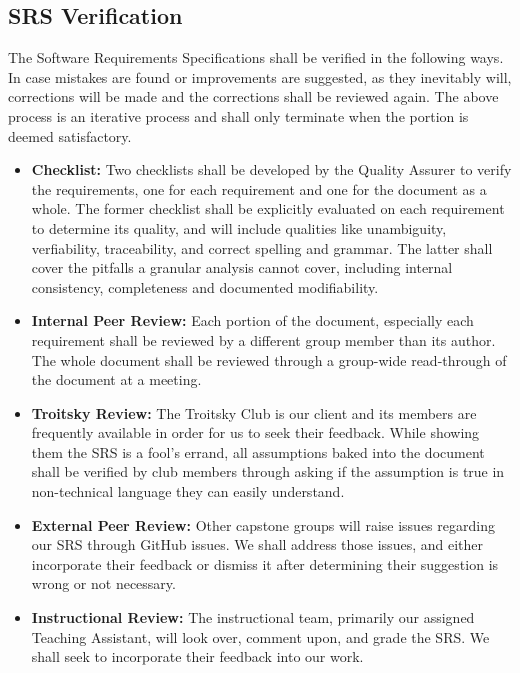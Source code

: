 \documentclass[12pt, titlepage]{article}
\begin{document}
\subsection{SRS Verification}





The Software Requirements Specifications shall be verified in the following ways. In case mistakes are found or improvements are suggested, as they inevitably will, corrections will be made and the corrections shall be reviewed again.
The above process is an iterative process and shall only terminate when the portion is deemed satisfactory.

\begin{itemize}
    \item \textbf{Checklist:} Two checklists shall be developed by the Quality Assurer to verify the requirements, one for each requirement and one for the document as a whole. The former checklist shall be explicitly evaluated on each requirement to determine its quality, and will include qualities like unambiguity, verfiability, traceability, and correct spelling and grammar. The latter shall cover the pitfalls a granular analysis cannot cover, including internal consistency, completeness and documented modifiability.
    \item \textbf{Internal Peer Review:} Each portion of the document, especially each requirement shall be reviewed by a different group member than its author. The whole document shall be reviewed through a group-wide read-through of the document at a meeting.
    \item \textbf{Troitsky Review:} The Troitsky Club is our client and its members are frequently available in order for us to seek their feedback. While showing them the SRS is a fool's errand, all assumptions baked into the document shall be verified by club members through asking if the assumption is true in non-technical language they can easily understand. 
    \item \textbf{External Peer Review:} Other capstone groups will raise issues regarding our SRS through GitHub issues. We shall address those issues, and either incorporate their feedback or dismiss it after determining their suggestion is wrong or not necessary.
    \item \textbf{Instructional Review:} The instructional team, primarily our assigned Teaching Assistant, will look over, comment upon, and grade the SRS. We shall seek to incorporate their feedback into our work.
\end{itemize}
\end{document}

